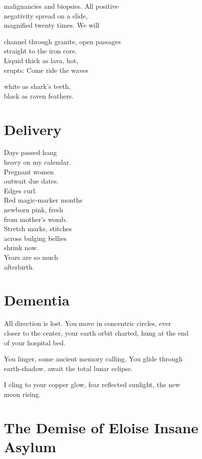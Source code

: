 \documentclass[twoside,10pt]{book}
\begin{document}
malignancies and biopsies. All positive\\
negativity spread on a slide,\\
magnified twenty times. We will

channel through granite, open passages\\
straight to the iron core.\\
Liquid thick as lava, hot,\\
erupts: Come ride the waves

white as shark's teeth,\\
black as raven feathers.


\clearpage
\section{Delivery}

Days passed hang\\
heavy on my calendar.\\
Pregnant women\\
outwait due dates.\\
Edges curl.\\
Red magic-marker months\\
newborn pink, fresh\\
from mother's womb.\\
Stretch marks, stitches\\
across bulging bellies\\
shrink now.\\
Years are so much\\
afterbirth.


\clearpage
\section{Dementia}

All direction is lost. You move in concentric circles, ever\\
closer to the center, your earth orbit charted, hung at the end\\
of your hospital bed.

You linger, some ancient memory calling. You glide through\\
earth-shadow, await the total lunar eclipse.

I cling to your copper glow, fear reflected sunlight, the new\\
moon rising.


\clearpage
\section{The Demise of Eloise Insane Asylum}
\end{document}
